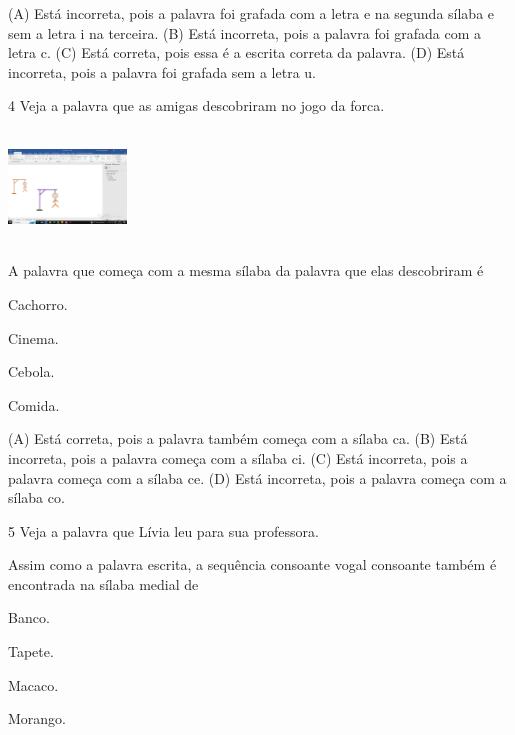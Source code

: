 (A) Está incorreta, pois a palavra foi grafada com a letra e na segunda sílaba e sem a letra i na terceira.
(B) Está incorreta, pois a palavra foi grafada com a letra c.
(C) Está correta, pois essa é a escrita correta da palavra.
(D) Está incorreta, pois a palavra foi grafada sem a letra u.

\num{4} Veja a palavra que as amigas descobriram no jogo da forca.

\includegraphics[width=1.24236in,height=1.17500in]{media/image166.png}

A palavra que começa com a mesma sílaba da palavra que elas descobriram é

\begin{minipage}{.5\textwidth}
\begin{escolha}
\item Cachorro.

\item Cinema.

\item Cebola.

\item Comida.
\end{escolha}
\end{minipage}

(A) Está correta, pois a palavra também começa com a sílaba ca.
(B) Está incorreta, pois a palavra começa com a sílaba ci.
(C) Está incorreta, pois a palavra começa com a sílaba ce.
(D) Está incorreta, pois a palavra começa com a sílaba co.

\num{5} Veja a palavra que Lívia leu para sua professora.

Assim como a palavra escrita, a sequência consoante vogal consoante também é encontrada na sílaba medial de

\begin{minipage}{.5\textwidth}
\begin{escolha}
\item Banco.

\item Tapete.

\item Macaco.

\item Morango.
\end{escolha}
\end{minipage}

